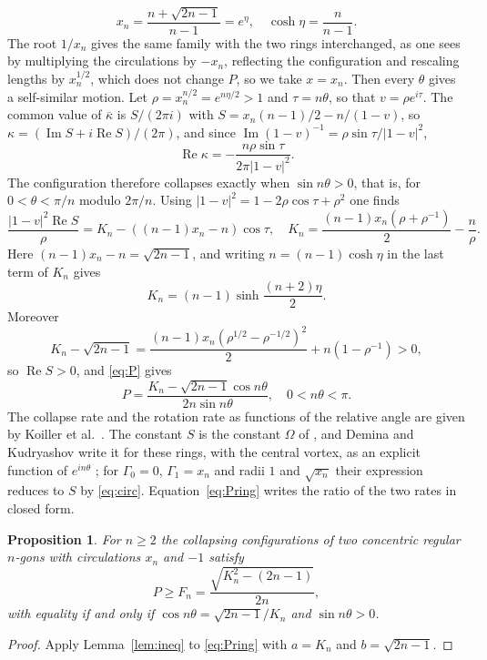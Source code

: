 \documentclass[11pt]{article}
\newtheorem{proposition}{Proposition}
\theoremstyle{definition}
\newcommand{\re}{\operatorname{Re}}
\newcommand{\im}{\operatorname{Im}}
\begin{document}
\[
  x_n = \frac{n + \sqrt{2n - 1}}{n - 1} = e^\eta, \quad \cosh\eta = \frac{n}{n - 1}.
\]
The root $1/x_n$ gives the same family with the two rings interchanged, as one sees by multiplying the circulations by $-x_n$, reflecting the configuration and rescaling lengths by $x_n^{1/2}$, which does not change $P$, so we take $x = x_n$. Then every $\theta$ gives a self-similar motion. Let $\rho = x_n^{n/2} = e^{n\eta/2} > 1$ and $\tau = n\theta$, so that $v = \rho e^{i\tau}$. The common value of $\overline{\kappa}$ is $S/(2\pi i)$ with $S = x_n(n - 1)/2 - n/(1 - v)$, so $\kappa = (\im S + i\re S)/(2\pi)$, and since $\im(1 - v)^{-1} = \rho\sin\tau/|1 - v|^2$,
\[
  \re\kappa = -\frac{n\rho\sin\tau}{2\pi|1 - v|^2}.
\]
The configuration therefore collapses exactly when $\sin n\theta > 0$, that is, for $0 < \theta < \pi/n$ modulo $2\pi/n$. Using $|1 - v|^2 = 1 - 2\rho\cos\tau + \rho^2$ one finds
\[
  \frac{|1 - v|^2 \re S}{\rho} = K_n - ((n - 1)x_n - n)\cos\tau, \quad
  K_n = \frac{(n - 1)x_n(\rho + \rho^{-1})}{2} - \frac{n}{\rho}.
\]
Here $(n - 1)x_n - n = \sqrt{2n - 1}$, and writing $n = (n - 1)\cosh\eta$ in the last term of $K_n$ gives
\[
  K_n = (n - 1)\sinh\frac{(n + 2)\eta}{2}.
\]
Moreover
\[
  K_n - \sqrt{2n - 1} = \frac{(n - 1)x_n(\rho^{1/2} - \rho^{-1/2})^2}{2} + n(1 - \rho^{-1}) > 0,
\]
so $\re S > 0$, and \eqref{eq:P} gives
\begin{equation}\label{eq:Pring}
  P = \frac{K_n - \sqrt{2n - 1}\cos n\theta}{2n\sin n\theta}, \quad 0 < n\theta < \pi.
\end{equation}
The collapse rate and the rotation rate as functions of the relative angle are given by Koiller et al.\ \cite[Sect.~11]{koiller1985}. The constant $S$ is the constant $\Omega$ of \cite[Eq.~(11)]{dk2014}, and Demina and Kudryashov write it for these rings, with the central vortex, as an explicit function of $e^{in\theta}$ \cite[Eq.~(36)]{dk2014}; for $\Gamma_0 = 0$, $\Gamma_1 = x_n$ and radii $1$ and $\sqrt{x_n}$ their expression reduces to $S$ by \eqref{eq:circ}. Equation~\eqref{eq:Pring} writes the ratio of the two rates in closed form.

\begin{proposition}\label{prop:rings}
For $n \ge 2$ the collapsing configurations of two concentric regular $n$-gons with circulations $x_n$ and $-1$ satisfy
\[
  P \ge F_n = \frac{\sqrt{K_n^2 - (2n - 1)}}{2n},
\]
with equality if and only if $\cos n\theta = \sqrt{2n - 1}/K_n$ and $\sin n\theta > 0$.
\end{proposition}

\begin{proof}
Apply Lemma~\ref{lem:ineq} to \eqref{eq:Pring} with $a = K_n$ and $b = \sqrt{2n - 1}$.
\end{proof}
\end{document}
